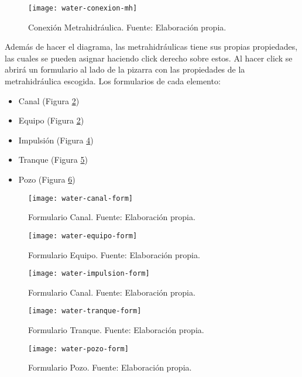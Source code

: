 \begin{figure}[H]
	\centering
	\texttt{[image: water-conexion-mh]}
	\caption{\label{fig:water-conexion-mh} Conexión Metrahidráulica. Fuente: Elaboración propia.}
\end{figure}

Además de hacer el diagrama, las metrahidráulicas tiene sus propias propiedades, las cuales se pueden asignar haciendo click derecho sobre estos. Al hacer click se abrirá un formulario al lado de la pizarra con las propiedades de la metrahidráulica escogida.
Los formularios de cada elemento:
\begin{itemize}
    \item Canal (Figura \ref{fig:water-canal-form})
    \item Equipo (Figura \ref{fig:water-canal-form})
    \item Impulsión (Figura \ref{fig:water-impulsion-form})
    \item Tranque (Figura \ref{fig:water-tranque-form})
    \item Pozo (Figura \ref{fig:water-pozo-form})
\end{itemize}

\begin{figure}[H]
	\centering
	\texttt{[image: water-canal-form]}
	\caption{\label{fig:water-canal-form} Formulario Canal. Fuente: Elaboración propia.}
\end{figure}

\begin{figure}[H]
	\centering
	\texttt{[image: water-equipo-form]}
	\caption{\label{fig:water-Equipo-form} Formulario Equipo. Fuente: Elaboración propia.}
\end{figure}

\begin{figure}[H]
	\centering
	\texttt{[image: water-impulsion-form]}
	\caption{\label{fig:water-impulsion-form} Formulario Canal. Fuente: Elaboración propia.}
\end{figure}

\begin{figure}[H]
	\centering
	\texttt{[image: water-tranque-form]}
	\caption{\label{fig:water-tranque-form} Formulario Tranque. Fuente: Elaboración propia.}
\end{figure}

\begin{figure}[H]
	\centering
	\texttt{[image: water-pozo-form]}
	\caption{\label{fig:water-pozo-form} Formulario Pozo. Fuente: Elaboración propia.}
\end{figure}

